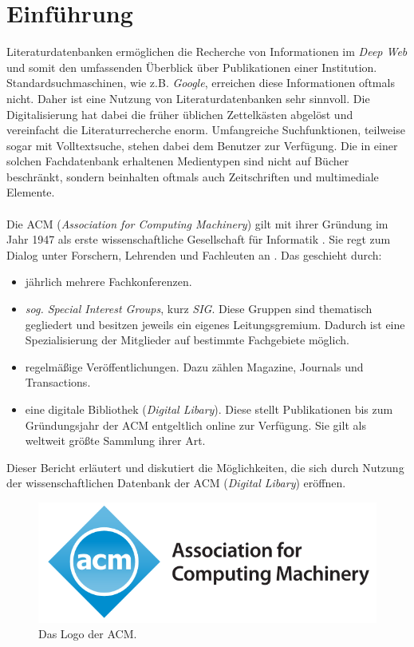 \documentclass[
	ngerman,
	parskip=half,
	headsepline,
	fontsize=12pt,
	DIV=13,
	listof=leveldown,
	]{scrreprt}
\begin{document}
	\chapter{Einführung}	
	Literaturdatenbanken ermöglichen die Recherche von Informationen im \textit{Deep Web} und somit den umfassenden Überblick über Publikationen einer Institution. Standardsuchmaschinen, wie z.B. \textit{Google}, erreichen diese Informationen oftmals nicht. Daher ist eine Nutzung von Literaturdatenbanken sehr sinnvoll. Die Digitalisierung hat dabei die früher üblichen Zettelkästen abgelöst und vereinfacht die Literaturrecherche enorm. Umfangreiche Suchfunktionen, teilweise sogar mit Volltextsuche, stehen dabei dem Benutzer zur Verfügung. Die in einer solchen Fachdatenbank erhaltenen Medientypen sind nicht auf Bücher beschränkt, sondern beinhalten oftmals auch Zeitschriften und multimediale Elemente. \cite{resource:wld}
	\ \\
	\ \\
	Die ACM (\textit{Association for Computing Machinery}) gilt mit ihrer Gründung im Jahr 1947 als erste wissenschaftliche Gesellschaft für Informatik \cite{resource:wacm}. Sie regt zum Dialog unter Forschern, Lehrenden und Fachleuten an \cite{resource:aacm}. Das geschieht durch:
\begin{itemize}
\item jährlich mehrere Fachkonferenzen.
\item \textit{sog. Special Interest Groups}, kurz \textit{SIG}. Diese Gruppen sind thematisch gegliedert und besitzen jeweils ein eigenes Leitungsgremium. Dadurch ist eine Spezialisierung der Mitglieder auf bestimmte Fachgebiete möglich.
\item regelmäßige Veröffentlichungen. Dazu zählen Magazine, Journals und Transactions.
\item eine digitale Bibliothek (\textit{Digital Libary}). Diese stellt Publikationen bis zum Gründungsjahr der ACM entgeltlich online zur Verfügung. Sie gilt als weltweit größte Sammlung ihrer Art.
\end{itemize}
Dieser Bericht erläutert und diskutiert die Möglichkeiten, die sich durch Nutzung der wissenschaftlichen Datenbank der ACM (\textit{Digital Libary}) eröffnen.
\ \\
\begin{figure}[ht]
\begin{minipage}[b]{0.47\linewidth}
\centering
\includegraphics[width=\textwidth]{img/acmLogo.PNG}
\end{minipage}
\caption{Das Logo der ACM. {\cite{image:acmlogo}}}
\end{figure}
\end{document}
